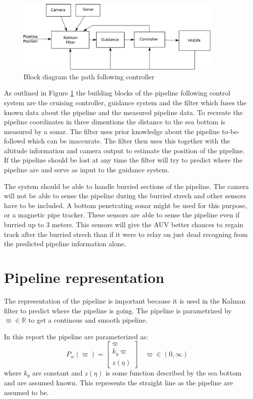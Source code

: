 	\begin{figure}[hbtp]
		\centering
		\includegraphics[width=0.9\textwidth]{pics/blockdiagram}
		\caption{Block diagram the path following controller}
		\label{fig:ch2-blockdiagram}
	\end{figure}
	As outlined in Figure \ref{fig:ch2-blockdiagram} the building blocks of the pipeline following
	control system are the cruising controller, guidance system and the filter
	which fuses the known data about the pipeline and the measured pipeline data. To recreate the 
	pipeline coordinates in three dimentions the distance to the sea bottom is measured by a sonar. The
	filter uses prior knowledge about the pipeline to-be-followd which can be inaccurate. The filter then
	uses this together with the altitude information and camera output to estimate the position of the
	pipeline. If the pipeline should be lost at any time the filter will try to predict where the pipeline
	are and serve as input to the guidance system.
	
	The system should be able to handle burried sections of the pipeline. The camera will not be able to
	sense the pipeline during the burried strech and other sensors have to be included. A bottom
	penetrating sonar might be used for this purpose, or a magnetic pipe tracker. These sensors are able
	to sense the pipeline even if burried up to 3 meters. \cite{PhD_lecture} This sensors will give the
	AUV better chances to regain track after the burried strech than if it were to relay on just dead
	recogning from the predicted pipeline information alone.

\section{Pipeline representation}
	The representation of the pipeline is important because it is used in the Kalman filter to predict
	where the pipeline is going. The pipeline is parametrized by $\varpi \in \mathbb{R}$ to get a
	continous and smooth pipeline.

	In this report the pipeline are parameterized as:
	\begin{equation}
		P_w(\varpi) = \left [ \begin{array}{c}
					\varpi \\
					k_y \varpi \\
					z(\eta)
				\end{array} \right ] \quad \varpi \in (0, \infty)
	\end{equation}
	where $k_y$ are constant and $z(\eta)$ is some function described by the sea bottom and are assumed
	known. This represents the straight line as the pipeline are assumed to be.
	
